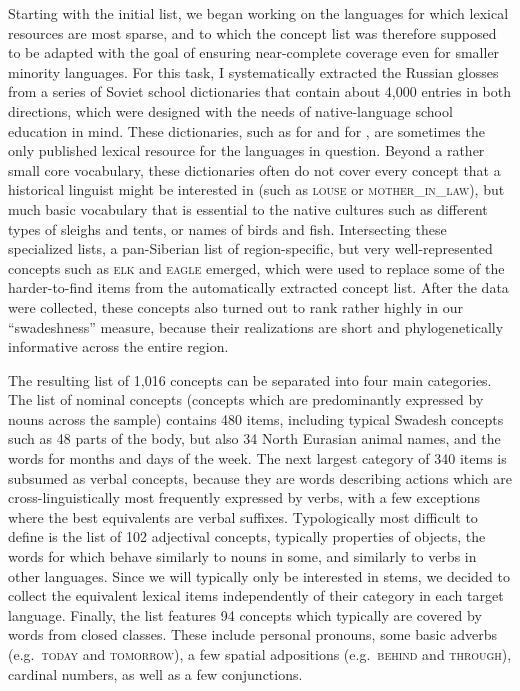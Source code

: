 Starting with the initial list, we began working on the languages for which lexical resources are most sparse, and to which the concept list was therefore supposed to be adapted with the goal of ensuring near-complete coverage even for smaller minority languages. For this task, I systematically extracted the Russian glosses from a series of Soviet school dictionaries that contain about 4,000 entries in both directions, which were designed with the needs of native-language school education in mind. These dictionaries, such as \cite{menovshchikov1988} for  and \cite{volodin1989} for , are sometimes the only published lexical resource for the languages in question. Beyond a rather small core vocabulary, these dictionaries often do not cover every concept that a historical linguist might be interested in (such as \textsc{louse} or \textsc{mother\_in\_law}), but much basic vocabulary that is essential to the native cultures such as different types of sleighs and tents, or names of birds 
and fish. Intersecting these specialized lists, a pan-Siberian list of region-specific, but very well-represented concepts such as \textsc{elk} and \textsc{eagle} emerged, which were used to replace some of the harder-to-find items from the automatically extracted concept list. After the data were collected, these concepts also turned out to rank rather highly in our ``swadeshness'' measure, because their realizations are short and phylogenetically informative across the entire region.

The resulting list of 1,016 concepts can be separated into four main categories. The list of nominal concepts (concepts which are predominantly expressed by nouns across the sample) contains 480 items, including typical Swadesh concepts such as 48 parts of the body, but also 34 North Eurasian animal names, and the words for months and days of the week. The next largest category of 340 items is subsumed as verbal concepts, because they are words describing actions which are cross-linguistically most frequently expressed by verbs, with a few exceptions where the best equivalents are verbal suffixes. Typologically most difficult to define is the list of 102 adjectival concepts, typically properties of objects, the words for which behave similarly to nouns in some, and similarly to verbs in other languages. Since we will typically only be interested in stems, we decided to collect the equivalent lexical items independently of their category in each target language. Finally, the list features 94 concepts which 
typically are covered by words from closed classes. These include personal pronouns, some basic adverbs (e.g.\ \textsc{today} and \textsc{tomorrow}), a few spatial adpositions (e.g.\ \textsc{behind} and \textsc{through}), cardinal numbers, as well as a few conjunctions.

